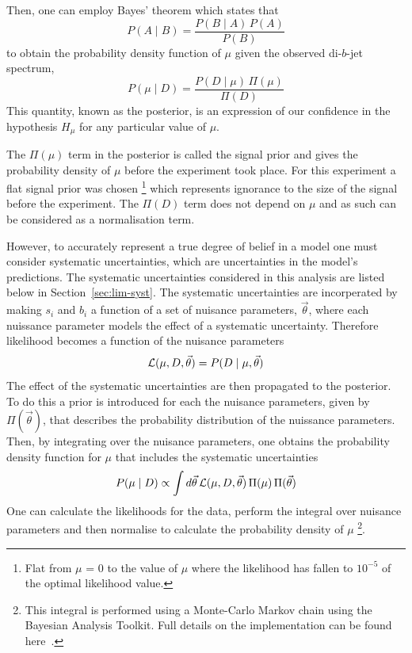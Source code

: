 \noindent
Then, one can employ Bayes' theorem which states that
\begin{equation}
  P(A \mid B) = \frac{P(B \mid A) \, P(A)}{P(B)}
\end{equation}
to obtain the probability density function of $\mu$ given the observed di-$b$-jet spectrum,
\begin{equation}
  P(\mu \mid D) = \frac{ P(D \mid \mu) \, \Pi( \mu ) }{ \Pi( D ) }
  \label{eq:lim-conf_statOnly}
\end{equation}
This quantity, known as the posterior, is an expression of our confidence in the hypothesis
$H_\mu$ for any particular value of $\mu$.

The $\Pi( \mu )$ term in the posterior %
is called the signal prior
and gives the probability density of $\mu$ before the experiment took place.
For this experiment a flat signal prior was chosen
\footnote{Flat from $\mu$ = 0 to the value of $\mu$ where the
likelihood has fallen to $10^{-5}$ of the optimal likelihood value.}
which represents ignorance to the size of the signal before the experiment.
The $\Pi(D)$ term does not depend on $\mu$ and as such can be considered as a normalisation term.

However, to accurately represent a true degree of belief in a model one must consider systematic uncertainties,
which are uncertainties in the model's predictions.
The systematic uncertainties considered in this analysis are listed below in Section~\ref{sec:lim-syst}.
The systematic uncertainties are incorperated by making $s_i$ and $b_i$ a function of a set of
nuisance parameters, $\vec{\theta}$, where each nuissance parameter models the effect of a systematic uncertainty.
Therefore likelihood becomes a function of the nuisance parameters
\begin{equation}
  \mathcal{L} (\mu,D,\vec{\theta}) = P(D \mid \mu, \vec{\theta} ) 
\end{equation}
The effect of the systematic uncertainties are then propagated to the posterior. %
To do this a prior is introduced for each the nuisance parameters, given by $\Pi(\vec{\theta})$,
that describes the probability distribution of the nuissance parameters.
Then, by integrating over the nuisance parameters,
one obtains the probability density function for $\mu$ that includes the systematic uncertainties
\begin{equation}
  P(\mu \mid D) \propto \int d \vec{\theta} \, \mathcal{L} (\mu, D, \vec{\theta} ) \, \Pi( \mu )  \, \Pi(\vec{\theta})
  \label{eq:lim-conf_syst}
\end{equation}
One can calculate the likelihoods for the data,
perform the integral over nuisance parameters
and then normalise to calculate the probability density of $\mu$
\footnote{This integral is performed using a Monte-Carlo Markov chain using the Bayesian Analysis Toolkit.
 Full details on the implementation can be found here~\cite{det-thesis_kate}.}.

